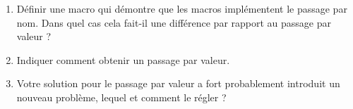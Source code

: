\begin{Exercise}[title={Macros et passage par nom}]
\begin{enumerate}
\item Définir une macro qui démontre que les macros implémentent le
  passage par nom. Dans quel cas cela fait-il une différence par
  rapport au passage par valeur ?
\item Indiquer comment obtenir un passage par valeur.
\item Votre solution pour le passage par valeur a fort probablement
  introduit un nouveau problème, lequel et comment le régler ?
\end{enumerate}
\end{Exercise}
